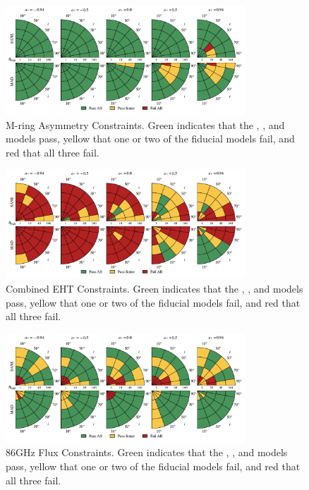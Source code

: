 \begin{figure}
  \centering
  \includegraphics[width=0.8\textwidth]{./figures/Mring_f1_Constraints.pdf}
  \caption{M-ring Asymmetry Constraints.  Green indicates that the \kharma, \bhac, and \hamr models pass, yellow that one or two of the fiducial models fail, and red that all three fail.}
  \label{fig:mring_asymm_pizza}
\end{figure}

\begin{figure}
  \centering
  \includegraphics[width=0.8\textwidth]{./figures/Interferometric_Constraints.pdf}
  \caption{Combined EHT Constraints.  Green indicates that the \kharma, \bhac, and \hamr models pass, yellow that one or two of the fiducial models fail, and red that all three fail.}
  \label{fig:eht_comb_pizza}
\end{figure}


\begin{figure}
  \centering
  \includegraphics[width=0.8\textwidth]{./figures/86GHz_flux_Constraints.pdf}
  \caption{86GHz Flux Constraints.  Green indicates that the \kharma, \bhac, and \hamr models pass, yellow that one or two of the fiducial models fail, and red that all three fail.}
  \label{fig:86GHz_flux_pizza}
\end{figure}

